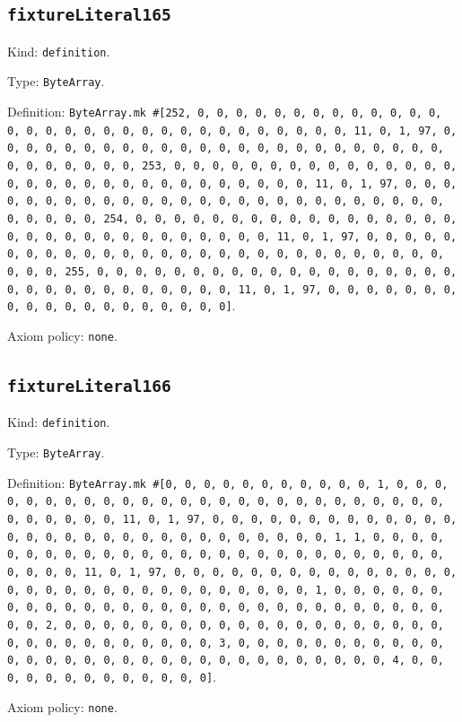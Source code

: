 \documentclass[11pt]{article}
\begin{document}
\subsection*{\texttt{fixtureLiteral165}}
\noindent Kind: \texttt{definition}.\par
\noindent Type: \texttt{ByteArray}.\par
\noindent Definition: \texttt{ByteArray.mk \#[252, 0, 0, 0, 0, 0, 0, 0, 0, 0, 0, 0, 0, 0, 0, 0, 0, 0, 0, 0, 0, 0, 0, 0, 0, 0, 0, 0, 0, 0, 0, 0, 11, 0, 1, 97, 0, 0, 0, 0, 0, 0, 0, 0, 0, 0, 0, 0, 0, 0, 0, 0, 0, 0, 0, 0, 0, 0, 0, 0, 0, 0, 0, 0, 0, 0, 0, 253, 0, 0, 0, 0, 0, 0, 0, 0, 0, 0, 0, 0, 0, 0, 0, 0, 0, 0, 0, 0, 0, 0, 0, 0, 0, 0, 0, 0, 0, 0, 0, 11, 0, 1, 97, 0, 0, 0, 0, 0, 0, 0, 0, 0, 0, 0, 0, 0, 0, 0, 0, 0, 0, 0, 0, 0, 0, 0, 0, 0, 0, 0, 0, 0, 0, 0, 254, 0, 0, 0, 0, 0, 0, 0, 0, 0, 0, 0, 0, 0, 0, 0, 0, 0, 0, 0, 0, 0, 0, 0, 0, 0, 0, 0, 0, 0, 0, 0, 11, 0, 1, 97, 0, 0, 0, 0, 0, 0, 0, 0, 0, 0, 0, 0, 0, 0, 0, 0, 0, 0, 0, 0, 0, 0, 0, 0, 0, 0, 0, 0, 0, 0, 0, 255, 0, 0, 0, 0, 0, 0, 0, 0, 0, 0, 0, 0, 0, 0, 0, 0, 0, 0, 0, 0, 0, 0, 0, 0, 0, 0, 0, 0, 0, 0, 0, 11, 0, 1, 97, 0, 0, 0, 0, 0, 0, 0, 0, 0, 0, 0, 0, 0, 0, 0, 0, 0, 0, 0]}.\par
\noindent Axiom policy: \texttt{none}.\par
\subsection*{\texttt{fixtureLiteral166}}
\noindent Kind: \texttt{definition}.\par
\noindent Type: \texttt{ByteArray}.\par
\noindent Definition: \texttt{ByteArray.mk \#[0, 0, 0, 0, 0, 0, 0, 0, 0, 0, 0, 1, 0, 0, 0, 0, 0, 0, 0, 0, 0, 0, 0, 0, 0, 0, 0, 0, 0, 0, 0, 0, 0, 0, 0, 0, 0, 0, 0, 0, 0, 0, 0, 0, 11, 0, 1, 97, 0, 0, 0, 0, 0, 0, 0, 0, 0, 0, 0, 0, 0, 0, 0, 0, 0, 0, 0, 0, 0, 0, 0, 0, 0, 0, 0, 0, 0, 0, 1, 1, 0, 0, 0, 0, 0, 0, 0, 0, 0, 0, 0, 0, 0, 0, 0, 0, 0, 0, 0, 0, 0, 0, 0, 0, 0, 0, 0, 0, 0, 0, 0, 11, 0, 1, 97, 0, 0, 0, 0, 0, 0, 0, 0, 0, 0, 0, 0, 0, 0, 0, 0, 0, 0, 0, 0, 0, 0, 0, 0, 0, 0, 0, 0, 0, 0, 0, 1, 0, 0, 0, 0, 0, 0, 0, 0, 0, 0, 0, 0, 0, 0, 0, 0, 0, 0, 0, 0, 0, 0, 0, 0, 0, 0, 0, 0, 0, 0, 0, 2, 0, 0, 0, 0, 0, 0, 0, 0, 0, 0, 0, 0, 0, 0, 0, 0, 0, 0, 0, 0, 0, 0, 0, 0, 0, 0, 0, 0, 0, 0, 0, 3, 0, 0, 0, 0, 0, 0, 0, 0, 0, 0, 0, 0, 0, 0, 0, 0, 0, 0, 0, 0, 0, 0, 0, 0, 0, 0, 0, 0, 0, 0, 0, 4, 0, 0, 0, 0, 0, 0, 0, 0, 0, 0, 0, 0, 0]}.\par
\noindent Axiom policy: \texttt{none}.\par
\end{document}
